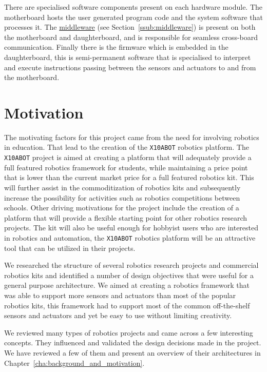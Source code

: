 There are specialised software components present on each hardware module. The motherboard hosts the user generated program code and the system software that processes it. The \hyperref[ssub:middleware]{middleware} (see Section~\ref{ssub:middleware}) is present on both the motherboard and daughterboard, and is responsible for seamless cross-board communication. Finally there is the firmware which is embedded in the daughterboard, this is semi-permanent software that is specialised to interpret and execute instructions passing between the sensors and actuators to and from the motherboard.

\section {Motivation}
The motivating factors for this project came from the need for involving
robotics in education. That lead to the creation of the \texttt{X10ABOT} robotics
platform. The \texttt{X10ABOT} project is aimed at creating a platform that will 
adequately provide a full featured robotics framework for students, while maintaining a
price point that is lower than the current market price for a full featured robotics kit.
This will further assist in the commoditization of robotics kits and subsequently
increase the possibility for activities such as robotics competitions between schools.
Other driving motivations for the project include the creation of a platform that
will provide a flexible starting point for other robotics research projects. The kit
will also be useful enough for hobbyist users who are interested in robotics
and automation, the \texttt{X10ABOT} robotics platform will be an attractive tool that
can be utilized in their projects.


We researched the structure of several robotics research projects and commercial robotics kits and identified a number of design objectives that were useful for a general purpose architecture. We aimed at creating a robotics framework that was able to support more sensors and actuators than most of the popular robotics kits, this framework had to support most of the common off-the-shelf sensors and actuators and yet be easy to use without limiting creativity. 

We reviewed many types of robotics projects and came across a few interesting concepts. They influenced and validated the design decisions made in the \xten project. We have reviewed a few of them and present an overview of their architectures in Chapter~\ref{cha:background_and_motivation}.

